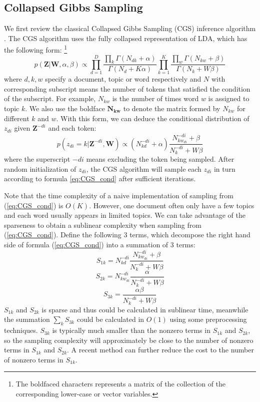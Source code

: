 \documentclass{article}
\begin{document}
\subsection{Collapsed Gibbs Sampling}
We first review the classical Collapsed Gibbs Sampling (CGS) inference algorithm \cite{griffiths2004finding}. The CGS algorithm uses the fully collapsed representation of LDA, which has the following form: \footnote{The boldfaced characters represents a matrix of the collection of the corresponding lower-case or vector variables. }
\[
p(\bm{Z}|\bm{W},\alpha,\beta) \propto 
\prod_{d=1}^{D} \frac{\prod_{k}\Gamma (N_{dk}+\alpha)}{\Gamma (N_d+K\alpha)}
\prod_{k=1}^{K} \frac{\prod_{w}\Gamma(N_{kw}+\beta)}{\Gamma(N_k+W\beta)}
\]
where $d,k,w$ specify a document, topic or word respectively and $N$ with corresponding subscript means the number of tokens that satisfied the condition of the subscript. For example, $N_{kw}$ is the number of times word $w$ is assigned to topic $k$. We also use the boldface $\bm{N_{kw}}$ to denote the matrix formed by $N_{kw}$ for different $k$ and $w$. With this form, we can deduce the conditional distribution of $z_{di}$ given $\bm{Z}^{-di}$ and each token:
\begin{equation}
p(z_{di}=k|\bm{Z}^{-di},\bm{W})\propto(N_{kd}^{-di}+\alpha) \frac{N_{kw_{di}}^{-di}+\beta}{N_k^{-di}+W\beta}
\label{eq:CGS_cond}
\end{equation}
where the superscript $-di$ means excluding the token being sampled. After random initialization of $z_{di}$, the CGS algorithm will sample each $z_{di}$ in turn according to formula \ref{eq:CGS_cond} after sufficient iterations. 

Note that the time complexity of a naive implementation of sampling from (\ref{eq:CGS_cond}) is $O(K)$. However, one document often only have a few topics and each word usually appears in limited topics. We can take advantage of the sparseness to obtain a sublinear complexity when sampling from (\ref{eq:CGS_cond}). Define the following 3 terms, which decompose the right hand side of formula (\ref{eq:CGS_cond}) into a summation of 3 terms:
$$S_{1k}=N_{kd}^{-di} \frac{N_{kw_{di}}^{-di}+\beta}{N_k^{-di}+W\beta}$$
$$S_{2k}=N_{kw_{di}}^{-di} \frac{\alpha}{N_k^{-di}+W\beta}$$
$$S_{3k}=\frac{\alpha\beta}{N_k^{-di}+W\beta}$$
$S_{1k}$ and $S_{2k}$ is sparse and thus could be calculated in sublinear time, meanwhile the summation $\sum_k S_{3k}$ could be calculated in $O(1)$ using some preprocessing techniques. $S_{3k}$ is typically much smaller than the nonzero terms in $S_{1k}$ and $S_{2k}$, so the sampling complexity will approximately be close to the number of nonzero terms in $S_{1k}$ and $S_{2k}$. A recent method \cite{aaron2014reducing} can further reduce the cost to the number of nonzero terms in $S_{1k}$.
\end{document}
